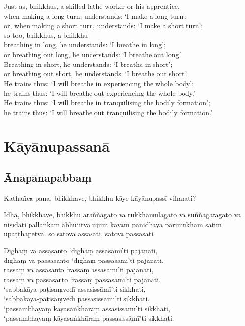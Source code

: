 Just as, bhikkhus, a skilled lathe-worker or his apprentice,\\
when making a long turn, understands: ‘I make a long turn’;\\
or, when making a short turn, understands: ‘I make a short turn’;\\
so too, bhikkhus, a bhikkhu\\
breathing in long, he understands: ‘I breathe in long’;\\
or breathing out long, he understands: ‘I breathe out long.’\\
Breathing in short, he understands: ‘I breathe in short’;\\
or breathing out short, he understands: ‘I breathe out short.’\\
He trains thus: ‘I will breathe in experiencing the whole body’;\\
he trains thus: ‘I will breathe out experiencing the whole body.’\\
He trains thus: ‘I will breathe in tranquilising the bodily formation’;\\
he trains thus: ‘I will breathe out tranquilising the bodily formation.’

\paliPage
\chapter*{Kāyānupassanā}

\section*{Ānāpānapabbaṃ}

Kathañca pana, bhikkhave, bhikkhu kāye kāyānupassī viharati?

Idha, bhikkhave, bhikkhu araññagato vā rukkhamūlagato vā suññāgāragato vā
nisīdati pallaṅkaṃ ābhujitvā ujuṃ kāyaṃ paṇidhāya parimukhaṃ satiṃ upaṭṭhapetvā.
so satova assasati, satova passasati.

Dīghaṃ vā assasanto ‘dīghaṃ assasāmī’ti pajānāti,\\
dīghaṃ vā passasanto ‘dīghaṃ passasāmī’ti pajānāti.\\
rassaṃ vā assasanto ‘rassaṃ assasāmī’ti pajānāti,\\
rassaṃ vā passasanto ‘rassaṃ passasāmī’ti pajānāti.\\
‘sabbakāya-paṭisaṃvedī assasissāmī’ti sikkhati,\\
‘sabbakāya-paṭisaṃvedī passasissāmī’ti sikkhati.\\
‘passambhayaṃ kāyasaṅkhāraṃ assasissāmī’ti sikkhati,\\
‘passambhayaṃ kāyasaṅkhāraṃ passasissāmī’ti sikkhati.

